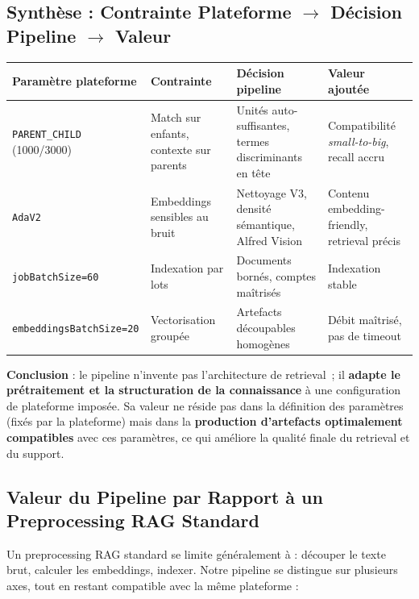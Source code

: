 \documentclass[12pt,a4paper]{report}
\begin{document}
\subsection{Synthèse : Contrainte Plateforme \texorpdfstring{$\rightarrow$}{->} Décision Pipeline \texorpdfstring{$\rightarrow$}{->} Valeur}
\label{sec:synthese_contraintes}

\begin{longtable}{p{2.8cm}p{3.5cm}p{3.2cm}p{2.8cm}}
\toprule
\textbf{Paramètre plateforme} & \textbf{Contrainte} & \textbf{Décision pipeline} & \textbf{Valeur ajoutée} \\
\midrule
\texttt{PARENT\_CHILD} (1000/3000) & Match sur enfants, contexte sur parents & Unités auto-suffisantes, termes discriminants en tête & Compatibilité \textit{small-to-big}, recall accru \\
\texttt{AdaV2} & Embeddings sensibles au bruit & Nettoyage V3, densité sémantique, Alfred Vision & Contenu embedding-friendly, retrieval précis \\
\texttt{jobBatchSize=60} & Indexation par lots & Documents bornés, comptes maîtrisés & Indexation stable \\
\texttt{embeddingsBatchSize=20} & Vectorisation groupée & Artefacts découpables homogènes & Débit maîtrisé, pas de timeout \\
\bottomrule
\end{longtable}

\textbf{Conclusion} : le pipeline n'invente pas l'architecture de retrieval~; il \textbf{adapte le prétraitement et la structuration de la connaissance} à une configuration de plateforme imposée. Sa valeur ne réside pas dans la définition des paramètres (fixés par la plateforme) mais dans la \textbf{production d'artefacts optimalement compatibles} avec ces paramètres, ce qui améliore la qualité finale du retrieval et du support.

\subsection{Valeur du Pipeline par Rapport à un Preprocessing RAG Standard}
\label{sec:valeur_vs_standard}

Un preprocessing RAG standard se limite généralement à : découper le texte brut, calculer les embeddings, indexer. Notre pipeline se distingue sur plusieurs axes, tout en restant compatible avec la même plateforme :
\end{document}
